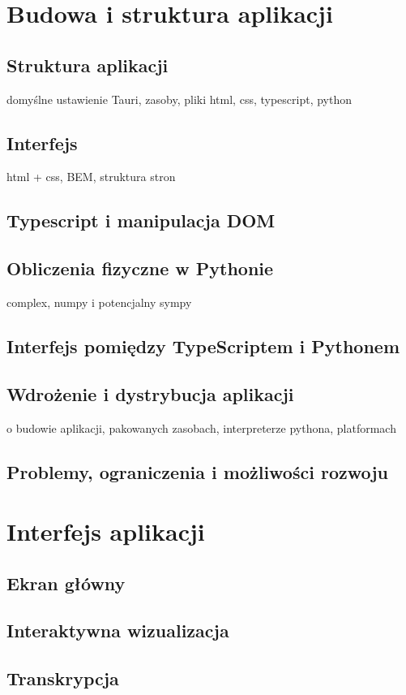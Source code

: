 \documentclass{SGGW-thesis}
\begin{document}
	
\chapter{Budowa i struktura aplikacji}
	\section{Struktura aplikacji}
	domyślne ustawienie Tauri, zasoby, pliki html, css, typescript, python
	\section{Interfejs}
	html + css, BEM, struktura stron
	\section{Typescript i manipulacja DOM}
	\section{Obliczenia fizyczne w Pythonie}
	complex, numpy i potencjalny sympy
	\section{Interfejs pomiędzy TypeScriptem i Pythonem}
	\section{Wdrożenie i dystrybucja aplikacji}
	o budowie aplikacji, pakowanych zasobach, interpreterze pythona, platformach
	\section{Problemy, ograniczenia i możliwości rozwoju}

\chapter{Interfejs aplikacji}
	\section{Ekran główny}
	\section{Interaktywna wizualizacja}
	\section{Transkrypcja}
	
\end{document}
